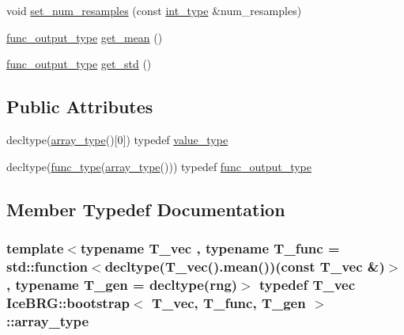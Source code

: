 \begin{DoxyCompactItemize}
\item 
void \hyperlink{classIceBRG_1_1bootstrap_afb9fc871c2a47bcb87de5bdf403b8bf6}{set\+\_\+num\+\_\+resamples} (const \hyperlink{lib_2IceBRG__main_2common_8h_ac4de9d9335536ac22821171deec8d39e}{int\+\_\+type} \&num\+\_\+resamples)
\item 
\hyperlink{classIceBRG_1_1bootstrap_a1639d76d292b98b3e4369a944d7bc13b}{func\+\_\+output\+\_\+type} \hyperlink{classIceBRG_1_1bootstrap_ad708a2b89ef927ea06abfc2393b73f49}{get\+\_\+mean} ()
\item 
\hyperlink{classIceBRG_1_1bootstrap_a1639d76d292b98b3e4369a944d7bc13b}{func\+\_\+output\+\_\+type} \hyperlink{classIceBRG_1_1bootstrap_aecec773649e47e5991621fa3a8f24dc3}{get\+\_\+std} ()
\end{DoxyCompactItemize}
\subsection*{Public Attributes}
\begin{DoxyCompactItemize}
\item 
decltype(\hyperlink{classIceBRG_1_1bootstrap_ad055f31f4e3e35b1cb99ea2f846f2f91}{array\+\_\+type}()\mbox{[}0\mbox{]}) typedef \hyperlink{classIceBRG_1_1bootstrap_a484f51dd78ae0dffeb18ef22bfdc4c6f}{value\+\_\+type}
\item 
decltype(\hyperlink{classIceBRG_1_1bootstrap_a4031940b86921fbeb3db1d05a823c7e7}{func\+\_\+type}(\hyperlink{classIceBRG_1_1bootstrap_ad055f31f4e3e35b1cb99ea2f846f2f91}{array\+\_\+type}())) typedef \hyperlink{classIceBRG_1_1bootstrap_a1639d76d292b98b3e4369a944d7bc13b}{func\+\_\+output\+\_\+type}
\end{DoxyCompactItemize}


\subsection{Member Typedef Documentation}
\hypertarget{classIceBRG_1_1bootstrap_ad055f31f4e3e35b1cb99ea2f846f2f91}{}
\subsubsection[{array\+\_\+type}]{\setlength{\rightskip}{0pt plus 5cm}template$<$typename T\+\_\+vec , typename T\+\_\+func  = std\+::function$<$decltype(\+T\+\_\+vec().\+mean())(const T\+\_\+vec \&)$>$, typename T\+\_\+gen  = decltype(rng)$>$ typedef T\+\_\+vec {\bf Ice\+B\+R\+G\+::bootstrap}$<$ T\+\_\+vec, T\+\_\+func, T\+\_\+gen $>$\+::{\bf array\+\_\+type}}\label{classIceBRG_1_1bootstrap_ad055f31f4e3e35b1cb99ea2f846f2f91}
\hypertarget{classIceBRG_1_1bootstrap_ac0d254f146b5ea54905304d2e54d9cac}{}

